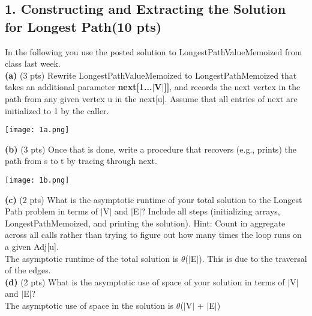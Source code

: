 \documentclass[12pt]{article}
\begin{document}
\subsection*{1. Constructing and Extracting the Solution for Longest Path(10 pts)}
\linebreak
In the following you use the posted solution to LongestPathValueMemoized from class last week. \\
\linebreak
\textbf{(a)} (3 pts) Rewrite LongestPathValueMemoized to LongestPathMemoized that takes an additional parameter \textbf{next[1...$\lvert$V$\rvert$]]}, and records the next vertex in the path from any given vertex u in the next[u]. Assume that all entries of next are initialized to 1 by the caller. \\
\linebreak
\begin{center}
\texttt{[image: 1a.png]}\\
\end{center}
\linebreak
\textbf{(b)} (3 pts) Once that is done, write a procedure that recovers (e.g., prints) the path from s to t by tracing through next. \\
\linebreak
\begin{center}
\texttt{[image: 1b.png]} \\
\end{center}
\linebreak
\textbf{(c)} (2 pts) What is the asymptotic runtime of your total solution to the Longest Path problem in terms of $\lvert$V$\rvert$ and $\lvert$E$\rvert$? Include all steps (initializing arrays, LongestPathMemoized, and printing the solution). Hint: Count in aggregate across all calls rather than trying to figure out how many times the loop runs on a given Adj[u]. \\
\linebreak
The asymptotic runtime of the total solution is $\theta$($\lvert$E$\rvert$). This is due to the traversal of the edges. \\
\linebreak
\textbf{(d)} (2 pts) What is the asymptotic use of space of your solution in terms of $\lvert$V$\rvert$ and $\lvert$E$\rvert$?  \\
\linebreak
The asymptotic use of space in the solution is $\theta$($\lvert$V$\rvert$ + $\lvert$E$\rvert$)\\
\end{document}
